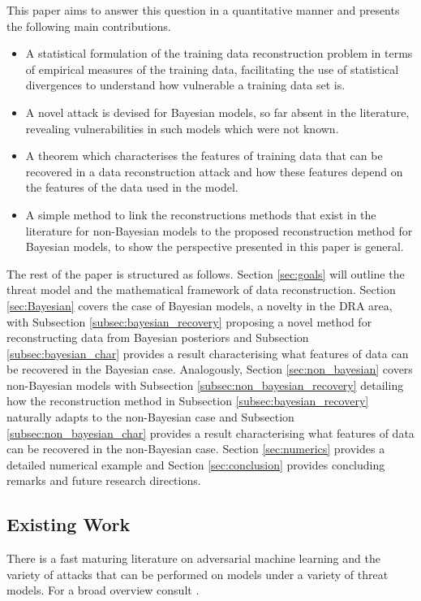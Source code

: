 \documentclass[hyperref]{article}
\theoremstyle{plain}
\theoremstyle{remark}
\begin{document}
This paper aims to answer this question in a quantitative manner and presents the following main contributions. 
\begin{itemize}
	\item A statistical formulation of the training data reconstruction problem in terms of empirical measures of the training data, facilitating the use of statistical divergences to understand how vulnerable a training data set is.
	
	\item A novel attack is devised for Bayesian models, so far absent in the literature, revealing vulnerabilities in such models which were not known.
	
	\item A theorem which characterises the features of training data that can be recovered in a data reconstruction attack and how these features depend on the features of the data used in the model.
	
	\item A simple method to link the reconstructions methods that exist in the literature for non-Bayesian models to the proposed reconstruction method for Bayesian models, to show the perspective presented in this paper is general. 
\end{itemize}

The rest of the paper is structured as follows. Section \ref{sec:goals} will outline the threat model and the mathematical framework of data reconstruction. Section \ref{sec:Bayesian} covers the case of Bayesian models, a novelty in the DRA area, with Subsection \ref{subsec:bayesian_recovery} proposing a novel method for reconstructing data from Bayesian posteriors and Subsection \ref{subsec:bayesian_char} provides a result characterising what features of data can be recovered in the Bayesian case. Analogously, Section \ref{sec:non_bayesian} covers non-Bayesian models with Subsection \ref{subsec:non_bayesian_recovery} detailing how the reconstruction method in Subsection \ref{subsec:bayesian_recovery} naturally adapts to the non-Bayesian case and Subsection \ref{subsec:non_bayesian_char} provides a result characterising what features of data can be recovered in the non-Bayesian case. Section \ref{sec:numerics} provides a detailed numerical example and Section \ref{sec:conclusion} provides concluding remarks and future research directions. 

\subsection{Existing Work}
There is a fast maturing literature on adversarial machine learning and the variety of attacks that can be performed on models under a variety of threat models. For a broad overview consult \citet{Ponomareva2023_DPfy,Dwork2017}.
\end{document}
